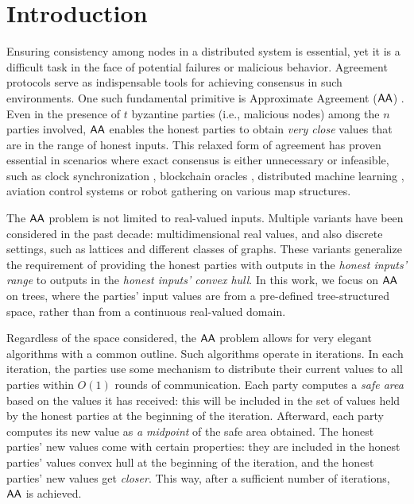 \section{Introduction}

Ensuring consistency among nodes in a distributed system is essential, yet it is a difficult task in the face of potential failures or malicious behavior. Agreement protocols serve as indispensable tools for achieving consensus in such environments. One such fundamental primitive is Approximate Agreement ($\textsf{AA}$) \cite{JACM:DLPSW86}. Even in the presence of $t$ byzantine parties (i.e., malicious nodes) among the $n$ parties involved, $\textsf{AA}$ enables the honest parties to obtain \emph{very close} values that are in the range of honest inputs. This relaxed form of agreement has proven essential in scenarios where exact consensus is either unnecessary or infeasible, such as clock synchronization \cite{PODC:LenLos22}, blockchain oracles \cite{delphi24}, distributed machine learning \cite{PODC:EGHR20,SuVai16,federated20, federated21}, aviation control systems \cite{OPODIS:StolWat15, IEEE:MelWat18} or robot gathering \cite{NBiS:PoRaTi11} on various map structures.



The $\textsf{AA}$ problem is not limited to real-valued inputs. Multiple variants have been considered in the past decade: multidimensional real values, and also discrete settings, such as lattices and different classes of graphs. These variants generalize the requirement of providing the honest parties with outputs in the \emph{honest inputs' range} to outputs in the \emph{honest inputs' convex hull}. In this work, we focus on $\textsf{AA}$ on trees, where the parties’ input values are from a pre-defined tree-structured space, rather than from a continuous real-valued domain. 


Regardless of the space considered, the $\textsf{AA}$ problem allows for very elegant algorithms with a common outline. Such algorithms operate in iterations. In each iteration, the parties use some mechanism to distribute their current values to all parties within $O(1)$ rounds of communication. Each party computes a \emph{safe area} based on the values it has received: this will be included in the set of values held by the honest parties at the beginning of the iteration. Afterward, each party computes its new value as \emph{a midpoint} of the safe area obtained. The honest parties' new values come with certain properties: they are included in the honest parties' values convex hull at the beginning of the iteration, and the honest parties' new values get \emph{closer}. This way, after a sufficient number of iterations, $\textsf{AA}$ is achieved.

